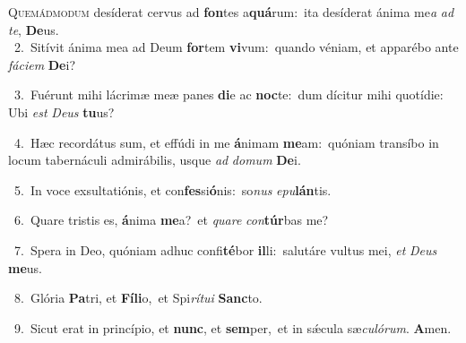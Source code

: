 \lettrine{\initial\textcolor{\initialcolor}{Q}}{uemádmodum} desíderat cervus ad \textbf{fon}\-tes a\-\textbf{quá}\-rum:~\star ita desíderat ánima me\textit{a} \textit{ad} \textit{te}\-, \textbf{De}\-us.\\
{\numbfont\textcolor{\numbcolor}{~2.}}~Sitívit ánima mea ad Deum \textbf{for}\-tem \textbf{vi}\-vum:~\star quando véniam, et apparébo ante \textit{fá}\-\textit{ci}\textit{em} \textbf{De}\-i?\par
{\numbfont\textcolor{\numbcolor}{~3.}}~Fuérunt mihi lácrimæ meæ panes \textbf{di}\-e ac \textbf{noc}\-te:~\star dum dícitur mihi quotídie: Ubi \textit{est} \textit{De}\-\textit{us} \textbf{tu}\-us?\par
{\numbfont\textcolor{\numbcolor}{~4.}}~Hæc recordátus sum, et effúdi in me \textbf{á}\-nimam \textbf{me}\-am:~\star quóniam transíbo in locum tabernáculi admirábilis, usque \textit{ad} \textit{do}\-\textit{mum} \textbf{De}\-i.\par
{\numbfont\textcolor{\numbcolor}{~5.}}~In voce exsultatiónis, et con\-\textbf{fes}\-si\-\textbf{ó}\-nis:~\star so\textit{nus} \textit{e}\-\textit{pu}\textbf{lán}tis.\par
{\numbfont\textcolor{\numbcolor}{~6.}}~Quare tristis es, \textbf{á}\-nima \textbf{me}\-a?~\star et \textit{qua}\-\textit{re} \textit{con}\-\textbf{túr}bas me?\par
{\numbfont\textcolor{\numbcolor}{~7.}}~Spera in Deo, quóniam adhuc confi\-\textbf{té}\-bor \textbf{il}\-li:~\star salutáre vultus mei, \textit{et} \textit{De}\-\textit{us} \textbf{me}\-us.\par
{\numbfont\textcolor{\numbcolor}{~8.}}~Glória \textbf{Pa}\-tri, et \textbf{Fí}\-\textbf{li}o,~\star et Spi\-\textit{rí}\-\textit{tu}\textit{i} \textbf{Sanc}\-to.\par
{\numbfont\textcolor{\numbcolor}{~9.}}~Sicut erat in princípio, et \textbf{nunc}\-, et \textbf{sem}\-per,~\star et in sǽcula sæ\-\textit{cu}\-\textit{ló}\textit{rum}. \textbf{A}\-men.\par
